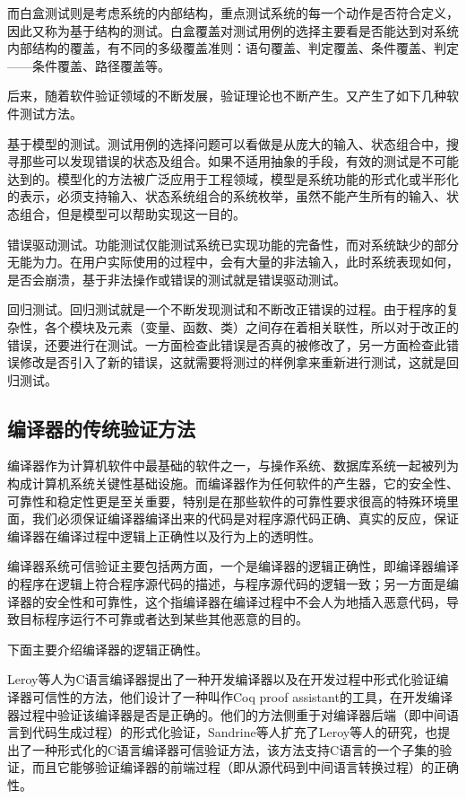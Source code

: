 而白盒测试则是考虑系统的内部结构，重点测试系统的每一个动作是否符合定义，因此又称为基于结构的测试。白盒覆盖对测试用例的选择主要看是否能达到对系统内部结构的覆盖，有不同的多级覆盖准则：语句覆盖、判定覆盖、条件覆盖、判定——条件覆盖、路径覆盖等。

后来，随着软件验证领域的不断发展，验证理论也不断产生。又产生了如下几种软件测试方法。

基于模型的测试。测试用例的选择问题可以看做是从庞大的输入、状态组合中，搜寻那些可以发现错误的状态及组合。如果不适用抽象的手段，有效的测试是不可能达到的。模型化的方法被广泛应用于工程领域，模型是系统功能的形式化或半形化的表示，必须支持输入、状态系统组合的系统枚举，虽然不能产生所有的输入、状态组合，但是模型可以帮助实现这一目的。

错误驱动测试。功能测试仅能测试系统已实现功能的完备性，而对系统缺少的部分无能为力。在用户实际使用的过程中，会有大量的非法输入，此时系统表现如何，是否会崩溃，基于非法操作或错误的测试就是错误驱动测试。

回归测试。回归测试就是一个不断发现测试和不断改正错误的过程。由于程序的复杂性，各个模块及元素（变量、函数、类）之间存在着相关联性，所以对于改正的错误，还要进行在测试。一方面检查此错误是否真的被修改了，另一方面检查此错误修改是否引入了新的错误，这就需要将测过的样例拿来重新进行测试，这就是回归测试。

\subsection{编译器的传统验证方法}
编译器作为计算机软件中最基础的软件之一，与操作系统、数据库系统一起被列为构成计算机系统关键性基础设施。而编译器作为任何软件的产生器，它的安全性、可靠性和稳定性更是至关重要，特别是在那些软件的可靠性要求很高的特殊环境里面，我们必须保证编译器编译出来的代码是对程序源代码正确、真实的反应，保证编译器在编译过程中逻辑上正确性以及行为上的透明性。

编译器系统可信验证主要包括两方面，一个是编译器的逻辑正确性，即编译器编译的程序在逻辑上符合程序源代码的描述，与程序源代码的逻辑一致；另一方面是编译器的安全性和可靠性，这个指编译器在编译过程中不会人为地插入恶意代码，导致目标程序运行不可靠或者达到某些其他恶意的目的。

下面主要介绍编译器的逻辑正确性。

Leroy等人为C语言编译器提出了一种开发编译器以及在开发过程中形式化验证编译器可信性的方法，他们设计了一种叫作Coq proof assistant的工具，在开发编译器过程中验证该编译器是否是正确的。他们的方法侧重于对编译器后端（即中间语言到代码生成过程）的形式化验证，Sandrine等人扩充了Leroy等人的研究，也提出了一种形式化的C语言编译器可信验证方法，该方法支持C语言的一个子集的验证，而且它能够验证编译器的前端过程（即从源代码到中间语言转换过程）的正确性。

